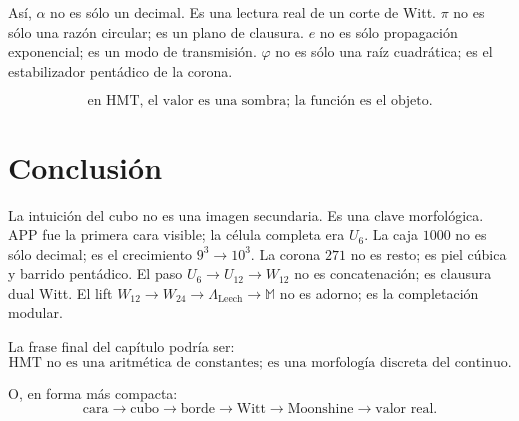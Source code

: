 \documentclass[11pt,a4paper]{article}
\theoremstyle{definition}
\theoremstyle{remark}
\newcommand{\Leech}{\Lambda_{\mathrm{Leech}}}
\newcommand{\Monster}{\mathbb M}
\begin{document}
Así, \(\alpha\) no es sólo un decimal. Es una lectura real de un corte de Witt. \(\pi\) no es sólo una razón circular; es un plano de clausura. \(e\) no es sólo propagación exponencial; es un modo de transmisión. \(\varphi\) no es sólo una raíz cuadrática; es el estabilizador pentádico de la corona.

\[
\boxed{
\text{en HMT, el valor es una sombra; la función es el objeto.}
}
\]

\section{Conclusión}

La intuición del cubo no es una imagen secundaria. Es una clave morfológica. APP fue la primera cara visible; la célula completa era \(U_6\). La caja \(1000\) no es sólo decimal; es el crecimiento \(9^3\to10^3\). La corona \(271\) no es resto; es piel cúbica y barrido pentádico. El paso \(U_6\to U_{12}\to W_{12}\) no es concatenación; es clausura dual Witt. El lift \(W_{12}\to W_{24}\to\Leech\to\Monster\) no es adorno; es la completación modular.

La frase final del capítulo podría ser:
\[
\boxed{
\text{HMT no es una aritmética de constantes; es una morfología discreta del continuo.}
}
\]

O, en forma más compacta:
\[
\boxed{
\text{cara}\to\text{cubo}\to\text{borde}\to\text{Witt}\to\text{Moonshine}\to\text{valor real}.
}
\]
\end{document}
